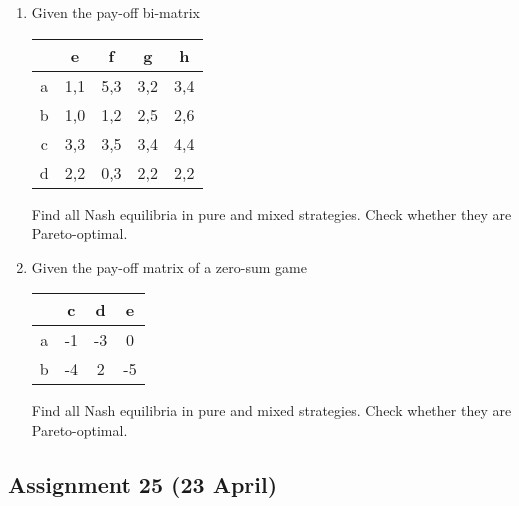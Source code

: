 \documentclass[a4paper]{article}
\begin{document}
\begin{enumerate}
\begin{enumerate}
\end{enumerate}
\item  Given the pay-off bi-matrix 


\begin{tabular}{c|cccc}
 & e & f & g & h \\ 
\hline
a & 1,1 & 5,3 & 3,2 & 3,4 \\ 
b & 1,0 & 1,2 & 2,5 & 2,6 \\ 
c & 3,3 & 3,5 & 3,4 & 4,4 \\ 
d & 2,2 & 0,3 & 2,2 & 2,2 \\ 
\end{tabular} 

Find all Nash equilibria in pure and mixed strategies. Check whether they are Pareto-optimal.

\item Given the pay-off matrix of a zero-sum game

\begin{tabular}{c|ccc}
 & c & d & e \\ 
\hline 
a & -1 & -3 & 0 \\ 
b & -4 & 2 & -5 \\ 
\end{tabular} 

Find all Nash equilibria in pure and mixed strategies. Check whether they are Pareto-optimal.

\end{enumerate}

\newpage
\subsection*{Assignment 25 (23 April)}
\end{document}
